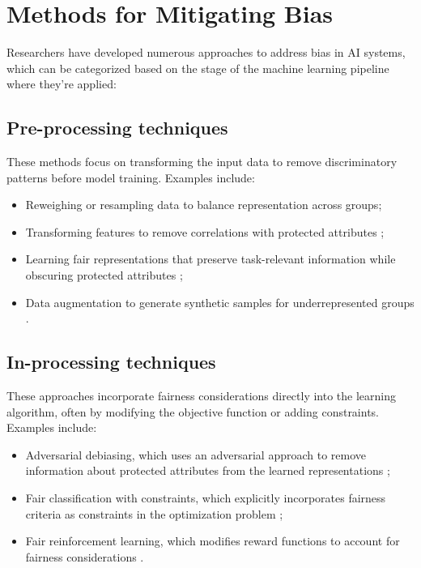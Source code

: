 \documentclass[12pt,a4paper,openright,twoside]{book}
\begin{document}
\section{Methods for Mitigating Bias}
Researchers have developed numerous approaches to address bias in AI systems, which can be categorized based on the stage of the machine learning pipeline where they're applied:


\subsection{Pre-processing techniques}
These methods focus on transforming the input data to remove discriminatory patterns before model training. Examples include:
\begin{itemize}
    \item Reweighing or resampling data to balance representation across groups;
    \item Transforming features to remove correlations with protected attributes \cite{kamiran2013quantifying};
    \item Learning fair representations that preserve task-relevant information 
    while obscuring protected attributes \cite{mehrabi2021survey};
    \item Data augmentation to generate synthetic samples for underrepresented groups \cite{mehrabi2021survey}.
\end{itemize}
    

\subsection{In-processing techniques} 
These approaches incorporate fairness considerations directly into the learning algorithm, often by modifying the objective function or adding constraints. Examples include:
\begin{itemize}
    \item Adversarial debiasing, which uses an adversarial approach to remove information about protected attributes from the learned representations \cite{mehrabi2021survey};
    \item Fair classification with constraints, which explicitly incorporates fairness criteria as constraints in the optimization problem \cite{corbett2023measure};
    \item Fair reinforcement learning, which modifies reward functions to account for fairness considerations \cite{mehrabi2021survey}.
\end{itemize}
    
\end{document}
